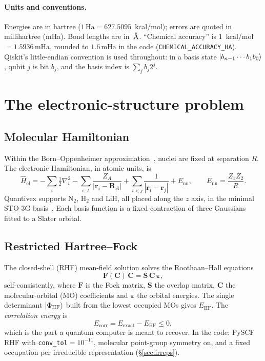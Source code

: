 \documentclass[10pt,a4paper]{article}
\newcommand{\Ha}{\,\mathrm{Ha}}
\newcommand{\mHa}{\,\mathrm{mHa}}
\newcommand{\Ang}{\ensuremath{\,\text{\normalfont\AA}}}
\newcommand{\code}[1]{\texttt{\small #1}}
\begin{document}
\paragraph{Units and conventions.} Energies are in hartree ($1\Ha = 627.5095$~kcal/mol); errors are quoted in millihartree (mHa). Bond lengths are in \Ang. ``Chemical accuracy'' is $1$~kcal/mol $=1.5936\mHa$, rounded to $1.6\mHa$ in the code (\code{CHEMICAL\_ACCURACY\_HA}). Qiskit's little-endian convention is used throughout: in a basis state $\ket{b_{n-1}\cdots b_1 b_0}$, qubit $j$ is bit $b_j$, and the basis index is $\sum_j b_j 2^j$.

\section{The electronic-structure problem}\label{sec:es}
\subsection{Molecular Hamiltonian}
Within the Born--Oppenheimer approximation~\cite{BornOppenheimer1927}, nuclei are fixed at separation $R$. The electronic Hamiltonian, in atomic units, is
\begin{equation}
\hat H_{\mathrm{el}} = -\sum_i \tfrac12\nabla_i^2 - \sum_{i,A}\frac{Z_A}{|\mathbf r_i-\mathbf R_A|} + \sum_{i<j}\frac{1}{|\mathbf r_i-\mathbf r_j|} + E_{\mathrm{nn}},\qquad E_{\mathrm{nn}}=\frac{Z_1Z_2}{R}.
\end{equation}
Quantivex supports N$_2$, H$_2$ and LiH, all placed along the $z$ axis, in the minimal STO-3G basis~\cite{Hehre1969}. Each basis function is a fixed contraction of three Gaussians fitted to a Slater orbital.

\subsection{Restricted Hartree--Fock}
The closed-shell (RHF) mean-field solution solves the Roothaan--Hall equations~\cite{Roothaan1951,SzaboOstlund}
\begin{equation}
\mathbf F(\mathbf C)\,\mathbf C=\mathbf S\,\mathbf C\,\bm\varepsilon ,
\end{equation}
self-consistently, where $\mathbf F$ is the Fock matrix, $\mathbf S$ the overlap matrix, $\mathbf C$ the molecular-orbital (MO) coefficients and $\bm\varepsilon$ the orbital energies. The single determinant $\ket{\Phi_{\mathrm{HF}}}$ built from the lowest occupied MOs gives $E_{\mathrm{HF}}$. The \emph{correlation energy} is
\begin{equation}
E_{\mathrm{corr}} = E_{\mathrm{exact}} - E_{\mathrm{HF}} \le 0 ,
\end{equation}
which is the part a quantum computer is meant to recover. In the code: PySCF~\cite{PySCF2020} RHF with \code{conv\_tol}$=10^{-11}$, molecular point-group symmetry on, and a fixed occupation per irreducible representation (\S\ref{sec:irreps}).
\end{document}
